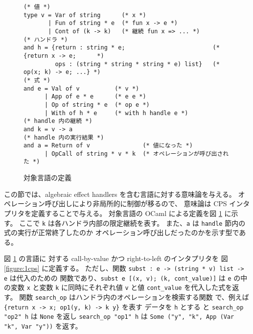 \begin{figure}[t]
\begin{verbatim}
(* 値 *)
type v = Var of string      (* x *)
       | Fun of string * e  (* fun x -> e *)
       | Cont of (k -> k)   (* 継続 fun x => ... *)
(* ハンドラ *)
and h = {return : string * e;                         (* {return x -> e;      *)
         ops : (string * string * string * e) list}   (*  op(x; k) -> e; ...} *)
(* 式 *)
and e = Val of v          (* v *)
      | App of e * e      (* e e *)
      | Op of string * e  (* op e *)
      | With of h * e     (* with h handle e *)
(* handle 内の継続 *)
and k = v -> a
(* handle 内の実行結果 *)
and a = Return of v               (* 値になった *)
      | OpCall of string * v * k  (* オペレーションが呼び出された *)
\end{verbatim}
\caption{対象言語の定義}
\label{figure:syntax}
\end{figure}

この節では、algebraic effect handlers を含む言語に対する意味論を与える。
オペレーション呼び出しにより非局所的に制御が移るので、
意味論は CPS インタプリタを定義することで与える。
対象言語の OCaml による定義を図 \ref{figure:syntax} に示す。
ここで \texttt{k} は各ハンドラ内部の限定継続を表す。
また、\texttt{a} は \texttt{handle} 節内の式の実行が正常終了したのか
オペレーション呼び出しだったのかを示す型である。



図 \ref{figure:syntax} の言語に
対する call-by-value かつ right-to-left のインタプリタを
図 \ref{figure:1cps} に定義する。
ただし、関数 \texttt{subst :\ e -> (string * v) list -> e} は代入のための
関数であり、\texttt{subst e [(x, v); (k, cont\_value)]} は \texttt{e}
の中の変数 \texttt{x} と変数 \texttt{k} に同時にそれぞれ値 \texttt{v}
と値 \texttt{cont\_value} を代入した式を返す。
関数 \texttt{search\_op} はハンドラ内のオペレーションを検索する関数
で、例えば \texttt{\{return x -> x; op1(y, k) -> k y\}} を表す
データを \texttt{h} とする
と \texttt{search\_op "op2" h} は \texttt{None} を返し
\texttt{search\_op "op1" h} は \texttt{Some ("y", "k", App (Var "k", Var
"y"))} を返す。


